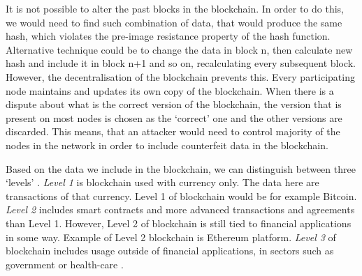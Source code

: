 It is not possible to alter the past blocks in the blockchain. In order to do this, we would need to find such combination of data, that would produce the same hash, which violates the pre-image resistance property of the hash function. Alternative technique could be to change the data in block n, then calculate new hash and include it in block n+1 and so on, recalculating every subsequent block. However, the decentralisation of the blockchain prevents this. Every participating node maintains and updates its own copy of the blockchain. When there is a dispute about what is the correct version of the blockchain, the version that is present on most nodes is chosen as the `correct' one and the other versions are discarded. This means, that an attacker would need to control majority of the nodes in the network in order to include counterfeit data in the blockchain.

Based on the data we include in the blockchain, we can distinguish between three `levels' \cite{Swan2015BlockchainEconomy}. \textit{Level 1} is blockchain used with currency only. The data here are transactions of that currency. Level 1 of blockchain would be for example Bitcoin. \textit{Level 2} includes smart contracts and more advanced transactions and agreements than Level 1. However, Level 2 of blockchain is still tied to financial applications in some way. Example of Level 2 blockchain is Ethereum platform. \textit{Level 3} of blockchain includes usage outside of financial applications, in sectors such as government or health-care \cite{Swan2015BlockchainEconomy}.







